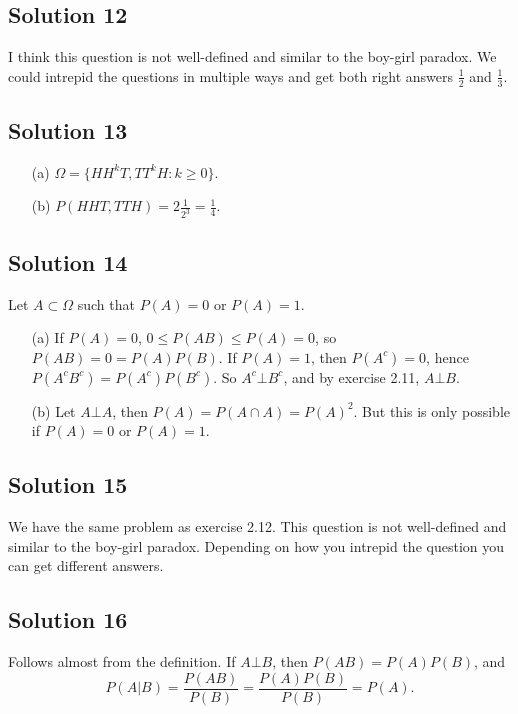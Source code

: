 \subsection*{Solution 12}

I think this question is not well-defined and similar to the boy-girl paradox.
We could intrepid the questions in multiple ways and get both right answers $\frac{1}{2}$ and $\frac{1}{3}$.


\subsection*{Solution 13}

\begin{itemize}
    \item[(a)] $\Omega = \{ HH^kT, TT^kH: k \geq 0 \}$.
    \item[(b)] $P(HHT, TTH) = 2 \frac{1}{2^3} = \frac{1}{4}$.
\end{itemize}


\subsection*{Solution 14}

Let $A \subset \Omega$ such that $P(A) = 0$ or $P(A) = 1$.
\begin{itemize}
    \item[(a)] If $P(A) = 0$, $0 \leq P(AB) \leq P(A) = 0$, so $P(AB) = 0 = P(A)P(B)$.
        If $P(A) = 1$, then $P(A^c) = 0$, hence $P(A^c B^c) = P(A^c) P(B^c)$.
        So $A^c \bot B^c$, and by exercise 2.11, $A \bot B$.
    \item[(b)] Let $A \bot A$, then $P(A) = P(A \cap A) = P(A)^2$.
        But this is only possible if $P(A) = 0$ or $P(A) = 1$.
\end{itemize}


\subsection*{Solution 15}

We have the same problem as exercise 2.12.
This question is not well-defined and similar to the boy-girl paradox.
Depending on how you intrepid the question you can get different answers.


\subsection*{Solution 16}

Follows almost from the definition.
If $A \bot B$, then $P(AB) = P(A)P(B)$, and
\begin{equation*}
    P(A|B) = \frac{P(AB)}{P(B)} = \frac{P(A)P(B)}{P(B)} = P(A).
\end{equation*}


